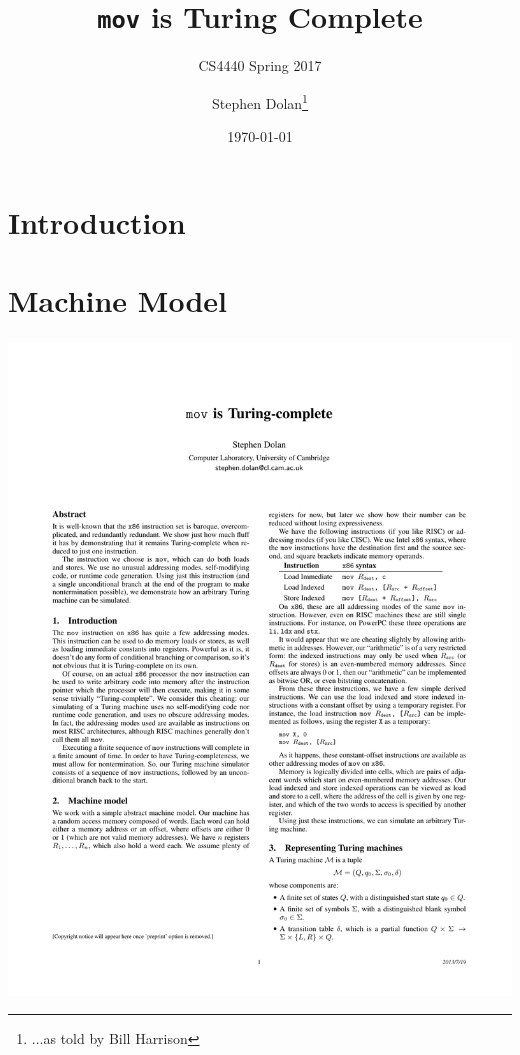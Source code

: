 \documentclass{beamer}
\title{{\tt mov} is Turing Complete}
\subtitle{CS4440 Spring 2017}
\author[]{Stephen Dolan\footnote{...as told by Bill Harrison}}
\date{\today}
\begin{document}
\frame{\titlepage}

\section{Introduction}

\section{Machine Model}

\begin{frame}[fragile]
\frametitle{}

\begin{center}
\includegraphics[scale=0.5]{figures/x86instructions}
\end{center}
\end{frame}

\end{document}
